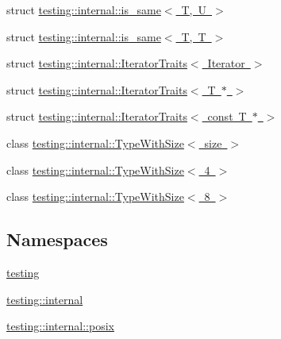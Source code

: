 \begin{DoxyCompactItemize}
\item 
struct \mbox{\hyperlink{structtesting_1_1internal_1_1is__same}{testing\+::internal\+::is\+\_\+same$<$ T, U $>$}}
\item 
struct \mbox{\hyperlink{structtesting_1_1internal_1_1is__same_3_01_t_00_01_t_01_4}{testing\+::internal\+::is\+\_\+same$<$ T, T $>$}}
\item 
struct \mbox{\hyperlink{structtesting_1_1internal_1_1_iterator_traits}{testing\+::internal\+::\+Iterator\+Traits$<$ Iterator $>$}}
\item 
struct \mbox{\hyperlink{structtesting_1_1internal_1_1_iterator_traits_3_01_t_01_5_01_4}{testing\+::internal\+::\+Iterator\+Traits$<$ T $\ast$ $>$}}
\item 
struct \mbox{\hyperlink{structtesting_1_1internal_1_1_iterator_traits_3_01const_01_t_01_5_01_4}{testing\+::internal\+::\+Iterator\+Traits$<$ const T $\ast$ $>$}}
\item 
class \mbox{\hyperlink{classtesting_1_1internal_1_1_type_with_size}{testing\+::internal\+::\+Type\+With\+Size$<$ size $>$}}
\item 
class \mbox{\hyperlink{classtesting_1_1internal_1_1_type_with_size_3_014_01_4}{testing\+::internal\+::\+Type\+With\+Size$<$ 4 $>$}}
\item 
class \mbox{\hyperlink{classtesting_1_1internal_1_1_type_with_size_3_018_01_4}{testing\+::internal\+::\+Type\+With\+Size$<$ 8 $>$}}
\end{DoxyCompactItemize}
\subsection*{Namespaces}
\begin{DoxyCompactItemize}
\item 
 \mbox{\hyperlink{namespacetesting}{testing}}
\item 
 \mbox{\hyperlink{namespacetesting_1_1internal}{testing\+::internal}}
\item 
 \mbox{\hyperlink{namespacetesting_1_1internal_1_1posix}{testing\+::internal\+::posix}}
\end{DoxyCompactItemize}
